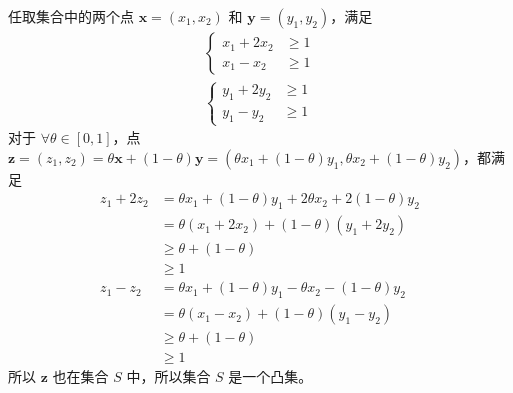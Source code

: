 \begin{solution}
    任取集合中的两个点 $\boldsymbol{x} = (x_1, x_2)$ 和 $\boldsymbol{y} = (y_1, y_2)$，满足 
    $$\begin{aligned}
        \left\{\begin{matrix} 
            x_1 + 2x_2 &\ge 1 \\  
            x_1 - x_2 &\ge 1
        \end{matrix}\right.\\
        \left\{\begin{matrix}
            y_1 + 2y_2 &\ge 1 \\  
            y_1 - y_2 &\ge 1
        \end{matrix}\right. 
    \end{aligned}$$
    对于 $\forall \theta \in \left[0, 1\right]$，点 $\boldsymbol{z} = (z_1, z_2) = \theta\boldsymbol{x} + (1 - \theta)\boldsymbol{y} = (\theta x_1 + (1 - \theta) y_1, \theta x_2 + (1 - \theta) y_2)$，都满足
    $$\begin{aligned}
        z_1 + 2z_2 &= \theta x_1 + (1 - \theta) y_1 + 2\theta x_2 + 2(1 - \theta) y_2\\
        &=\theta (x_1 + 2x_2) + (1 - \theta)(y_1 + 2y_2)\\
        &\ge \theta + (1 - \theta)\\
        &\ge 1\\
        z_1 - z_2 &= \theta x_1 + (1 - \theta) y_1 - \theta x_2 - (1 - \theta) y_2\\
        &=\theta(x_1 - x_2) + (1 - \theta)(y_1 - y_2) \\
        &\ge \theta + (1 - \theta)\\
        &\ge 1
    \end{aligned}$$
    所以 $\boldsymbol{z}$ 也在集合 $S$ 中，所以集合 $S$ 是一个凸集。
\end{solution}

